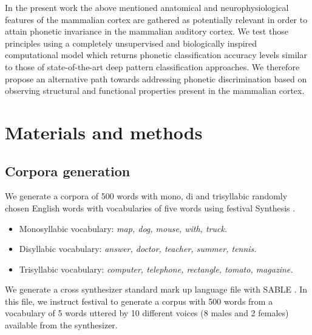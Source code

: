 \documentclass[10pt,letterpaper]{article}
\begin{document}
In the present work the above mentioned anatomical and neurophysiological features of the mammalian cortex are gathered as potentially relevant in order to attain phonetic invariance in the mammalian auditory cortex. We test those principles using a completely unsupervised and biologically inspired computational model which returns phonetic classification accuracy levels similar to those of state-of-the-art deep pattern classification approaches. We therefore propose an alternative path towards addressing phonetic discrimination based on observing structural and functional properties present in the mammalian cortex.


















\section*{Materials and methods}


\subsection*{Corpora generation}
\label{CorpGen}


We generate a corpora of 500 words with mono, di and trisyllabic randomly chosen English words with vocabularies of five words
using \gls{festival} Synthesis \cite{festival2014}.

\begin{itemize}
	\item Monosyllabic vocabulary: \textit{map, dog, mouse, with, truck.} %
	\item Disyllabic vocabulary: \textit{answer, doctor, teacher, summer, tennis.}  %
	\item Trisyllabic vocabulary: \textit{computer, telephone, rectangle, tomato, magazine.} %
\end{itemize}


We generate a cross synthesizer standard mark up language file with SABLE \cite{sable}.
In this file, we instruct \gls{festival} to generate a corpus with 500 words from a vocabulary of
5 words uttered by 10 different voices (8 males and 2 females) available from the synthesizer.
\end{document}
